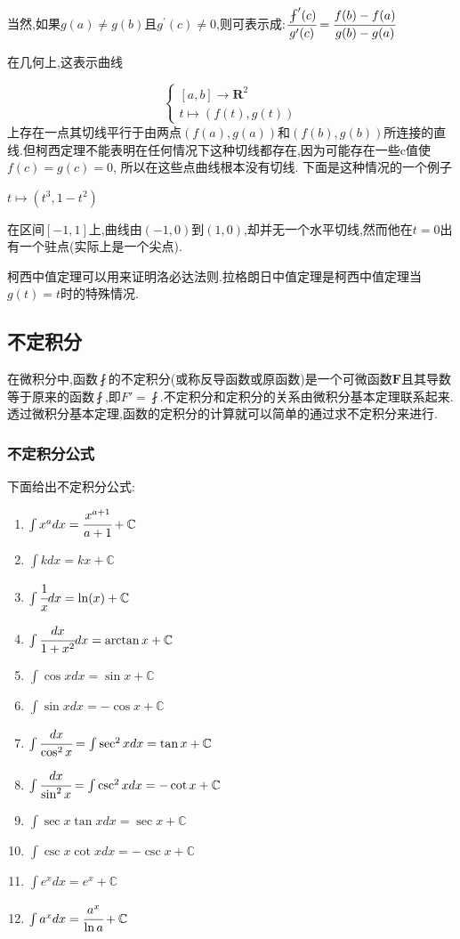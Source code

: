 \documentclass[UTF8,12pt]{ctexbook}
\newcommand{\derivative}{^\prime}
\newcommand{\fDerivative}[1]{\fint\derivative(#1)}
\newcommand{\defFunction}[1]{f(#1)}
\newcommand{\mathConstant}{\mathbb{C}}
\begin{document}
{{{{  当然,如果$g(a) \neq g(b)$且$g\derivative(c) \neq 0$,则可表示成:$\cfrac{\fDerivative{c}}{g\derivative(c)} = \cfrac{\defFunction{b} - \defFunction{a}}{g(b) - g(a)}$

  在几何上,这表示曲线

  $$
    \begin{cases}
      [a,b] \to \mathbf{R}^2 \\
      t \mapsto (f(t), g(t))
    \end{cases}
  $$
  上存在一点其切线平行于由两点$(\defFunction{a}, g(a))$和$(\defFunction{b}, g(b))$所连接的直线.但柯西定理不能表明在任何情况下这种切线都存在,因为可能存在一些c值使$\defFunction{c} = g(c) = 0$, 所以在这些点曲线根本没有切线.
  下面是这种情况的一个例子

  $t \mapsto (t^3, 1-t^2)$

  在区间$[-1,1]$上,曲线由$(-1, 0)$到$(1,0)$,却并无一个水平切线,然而他在$t = 0$出有一个驻点(实际上是一个尖点).

  柯西中值定理可以用来证明洛必达法则.拉格朗日中值定理是柯西中值定理当$g(t) = t$时的特殊情况.
}%

}%

\subsection{不定积分}{
  在微积分中,函数$\fint$的不定积分(或称反导函数或原函数)是一个可微函数$\mathbf{F}$且其导数等于原来的函数$\fint$,即$F\prime = \fint$.不定积分和定积分的关系由微积分基本定理联系起来.透过微积分基本定理,函数的定积分的计算就可以简单的通过求不定积分来进行.

  \subsubsection{不定积分公式}{
    下面给出不定积分公式:

    \begin{enumerate}
      \item $\int x^adx = \cfrac{x^{a+1}}{a+1} + \mathConstant$
      \item $\int kdx = kx + \mathConstant$
      \item $\int \cfrac{1}{x}dx = \ln(x) + \mathConstant$
      \item $\int \cfrac{dx}{1+x^2}dx = \arctan x + \mathConstant$
      \item $\int \cos xdx = \sin x + \mathConstant$
      \item $\int \sin xdx = -\cos x + \mathConstant$
      \item $\int \cfrac{dx}{\cos^2x} = \int \sec^2xdx = \tan x + \mathConstant$
      \item $\int \cfrac{dx}{\sin^2x} = \int\csc^2xdx = -\cot x + \mathConstant$
      \item $\int \sec x\tan xdx = \sec x + \mathConstant$
      \item $\int \csc x\cot xdx = -\csc x + \mathConstant$
      \item $\int e^xdx = e^x + \mathConstant$
      \item $\int a^xdx = \cfrac{a^x}{\ln a} + \mathConstant$
    \end{enumerate}

}}}}
\end{document}
